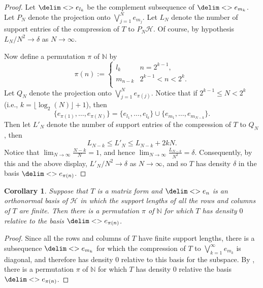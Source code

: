 \documentclass[10pt,reqno]{amsart}
\newtheorem{corollary}[theorem]{Corollary}
\theoremstyle{remark}
\newcommand{\Hil}{\mathcal{H}}
\newcommand{\seq}{\delim<>}
\numberwithin{equation}{section}
\begin{document}
\begin{proof}
  Let $\seq{e_{l_k}}$ be the complement subsequence of $\seq{e_{m_k}}$.
  Let $P_N$ denote the projection onto $\bigvee_{j=1}^N e_{m_j}$.
  Let $L_N$ denote the number of support entries of the compression of $T$ to $P_N \Hil$.
  Of course, by hypothesis $L_N/N^2 \to \delta$ as $N \to \infty$.

  Now define a permutation\footnotemark{} $\pi$ of $\mathbb{N}$ by
  \begin{equation*}
    \pi(n) :=
    \begin{cases}
      l_k & n = 2^{k-1}, \\
      m_{n - k} & 2^{k-1} < n < 2^k. \\
    \end{cases}
  \end{equation*}
  Let $Q_N$ denote the projection onto $\bigvee_{j=1}^N e_{\pi(j)}$.
  Notice that if $2^{k-1} \le N < 2^k$ (i.e., $k = \lfloor\log_2(N)\rfloor + 1$), then
  \begin{equation*}
    \{e_{\pi(1)},\ldots,e_{\pi(N)}\} = \{e_{l_1},\ldots,e_{l_k}\} \cup \{e_{m_1},\ldots,e_{m_{N - k}}\}.
  \end{equation*}
  Then let $L'_N$ denote the number of support entries of the compression of $T$ to $Q_N$, then
  \begin{equation*}
    L_{N-k} \le L'_N \le L_{N-k} + 2kN.
  \end{equation*}
  Notice that $\lim_{N \to \infty} \frac{N-k}{N} = 1$, and hence $\lim_{N \to \infty} \frac{L_{N-k}}{N^2} = \delta$.
  Consequently, by this and the above display, $L'_N/N^2 \to \delta$ as $N \to \infty$, and so $T$ has density $\delta$ in the basis $\seq{e_{\pi(n)}}$.
\end{proof}

\begin{corollary}
  \label{cor:row-column-finite-density-zero}
  Suppose that $T$ is a matrix form and $\seq{e_n}$ is an orthonormal basis of $\Hil$ in which the support lengths of all the rows and columns of $T$ are finite.
  Then there is a permutation $\pi$ of $\mathbb{N}$ for which $T$ has density $0$ relative to the basis $\seq{e_{\pi(n)}}$.
\end{corollary}

\begin{proof}
  Since all the rows and columns of $T$ have finite support lengths, there is a subsequence $\seq{e_{m_k}}$ for which the compression of $T$ to $\bigvee_{k=1}^{\infty} e_{m_k}$ is diagonal, and therefore has density $0$ relative to this basis for the subspace.
  By , there is a permutation $\pi$ of $\mathbb{N}$ for which $T$ has density $0$ relative the basis $\seq{e_{\pi(n)}}$.
\end{proof}
\end{document}
